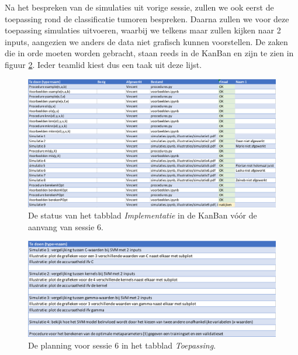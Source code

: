\documentclass{article}
\begin{document}
	Na het bespreken van de simulaties uit vorige sessie, zullen we ook eerst de toepassing rond de classificatie tumoren bespreken. Daarna zullen we voor deze toepassing simulaties uitvoeren, waarbij we telkens maar zullen kijken naar 2 inputs, aangezien we anders de data niet grafisch kunnen voorstellen. De zaken die in orde moeten worden gebracht, staan reeds in de KanBan en zijn te zien in figuur \ref{fig:kanban2}. Ieder teamlid kiest dus een taak uit deze lijst.
	
	\begin{figure}
		\centering
		\includegraphics[width=1\textwidth]{kanban}
		\caption{De status van het tabblad \textit{Implementatie} in de KanBan vóór de aanvang van sessie 6.}
		\label{fig:kanban}
	\end{figure}
	
	\begin{figure}
		\centering
		\includegraphics[width=1\textwidth]{kanban2}
		\caption{De planning voor sessie 6 in het tabblad \textit{Toepassing}.}
		\label{fig:kanban2}
	\end{figure}
	
\end{document}
